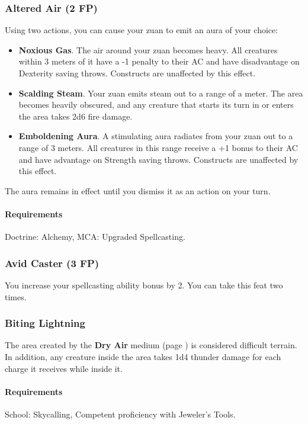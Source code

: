 \subsubsection{Altered Air (2 FP)} \label{feat::alteredair}
    Using two actions, you can cause your zuan to emit an aura of your choice:
    \begin{itemize}
        \item \textbf{Noxious Gas}.
        The air around your zuan becomes heavy.
        All creatures within 3 meters of it have a -1 penalty to their AC and have disadvantage on Dexterity saving throws.
        Constructs are unaffected by this effect.
        \item \textbf{Scalding Steam}.
        Your zuan emits steam out to a range of a meter.
        The area becomes heavily obscured, and any creature that starts its turn in or enters the area takes 2d6 fire damage.
        \item \textbf{Emboldening Aura}.
        A stimulating aura radiates from your zuan out to a range of 3 meters.
        All creatures in this range receive a +1 bonus to their AC and have advantage on Strength saving throws.
        Constructs are unaffected by this effect.
    \end{itemize}

    The aura remains in effect until you dismiss it as an action on your turn.
    \paragraph{Requirements} Doctrine: Alchemy, MCA: Upgraded Spellcasting.
\subsubsection{Avid Caster (3 FP)} \label{feat::avidcaster}
    You increase your spellcasting ability bonus by 2.
    You can take this feat two times.
\subsubsection{Biting Lightning} \label{feat::bitinglightning}
    The area created by the \textbf{Dry Air} medium (page \pageref{medium::dryair}) is considered difficult terrain.
    In addition, any creature inside the area takes 1d4 thunder damage for each charge it receives while inside it.
    \paragraph{Requirements} School: Skycalling, Competent proficiency with Jeweler's Tools.
